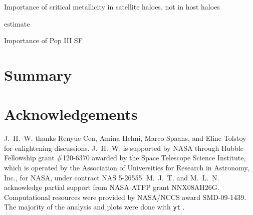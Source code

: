 \documentclass[useAMS,usenatbib]{mn2e}
\begin{document}
\li Importance of critical metallicity in satellite haloes, not in host
haloes

\li [$\alpha$/Fe] estimate

\li Importance of Pop III SF

\section{Summary}
\label{sec:summary}

\section*{Acknowledgements}

J.~H.~W. thanks Renyue Cen, Amina Helmi, Marco Spaans, and Eline
Tolstoy for enlightening discussions.  J.~H.~W. is supported by NASA
through Hubble Fellowship grant \#120-6370 awarded by the Space
Telescope Science Institute, which is operated by the Association of
Universities for Research in Astronomy, Inc., for NASA, under contract
NAS 5-26555.  M.~J.~T. and M.~L.~N. acknowledge partial support from
NASA ATFP grant NNX08AH26G.  Computational resources were provided by
NASA/NCCS award SMD-09-1439.  The majority of the analysis and plots
were done with \texttt{yt} \citep{yt_full_paper}.


\bsp
\label{lastpage}
\end{document}
